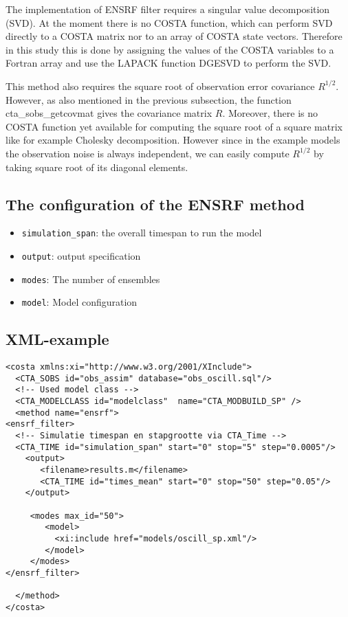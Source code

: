 The implementation of ENSRF filter requires a singular value decomposition
(SVD). At the moment there is no COSTA function, which can perform SVD directly
to a COSTA matrix nor to an array of COSTA state vectors. Therefore in this
study this is done by assigning the values of the COSTA variables to a Fortran
array and use the LAPACK function DGESVD to perform the SVD.

This method also requires the square root of observation error covariance
$R^{1/2}$. However, as also mentioned in the previous subsection, the function
cta\_sobs\_getcovmat gives the covariance matrix $R$. Moreover, there is no
COSTA function yet available for computing the square root of a square matrix
like for example Cholesky decomposition. However since in the example models
the observation noise is always independent, we can easily compute $R^{1/2}$ by
taking square root of its diagonal elements.

\subsection{The configuration of the ENSRF method}
\begin{itemize}
\item {\tt simulation\_span}: the overall timespan to run the model
\item {\tt output}: output specification
\item {\tt modes}: The number of ensembles
\item {\tt model}: Model configuration
\end{itemize}

\subsection{XML-example}
 \begin{verbatim}
<costa xmlns:xi="http://www.w3.org/2001/XInclude">
  <CTA_SOBS id="obs_assim" database="obs_oscill.sql"/>
  <!-- Used model class -->
  <CTA_MODELCLASS id="modelclass"  name="CTA_MODBUILD_SP" />
  <method name="ensrf"> 
<ensrf_filter>
  <!-- Simulatie timespan en stapgrootte via CTA_Time -->
  <CTA_TIME id="simulation_span" start="0" stop="5" step="0.0005"/>
    <output>
       <filename>results.m</filename>
       <CTA_TIME id="times_mean" start="0" stop="50" step="0.05"/>
    </output>

     <modes max_id="50">
        <model>
          <xi:include href="models/oscill_sp.xml"/>
        </model>        
     </modes>
</ensrf_filter>
  
  </method> 
</costa>
 \end{verbatim}




